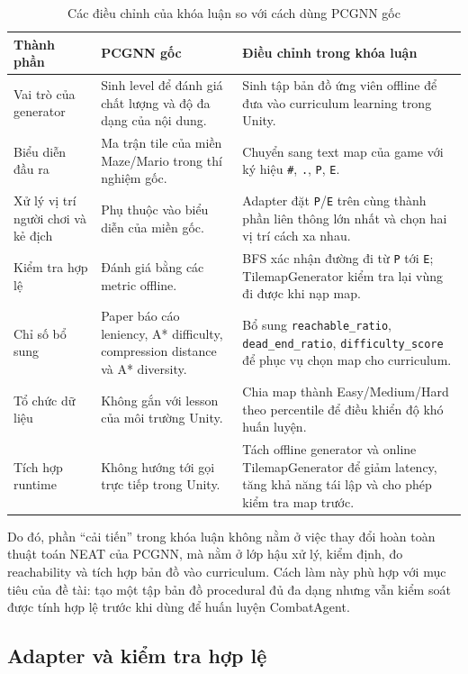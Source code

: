 \begin{table}[H]
    \centering
    \small
    \caption{Các điều chỉnh của khóa luận so với cách dùng PCGNN gốc}
    \label{tab:pcgnn_improvements}
    \begin{tabular}{p{4.0cm} p{5.0cm} p{5.0cm}}
        \toprule
        \textbf{Thành phần} & \textbf{PCGNN gốc} & \textbf{Điều chỉnh trong khóa luận} \\
        \midrule
        Vai trò của generator & Sinh level để đánh giá chất lượng và độ đa dạng của nội dung. & Sinh tập bản đồ ứng viên offline để đưa vào curriculum learning trong Unity. \\
        Biểu diễn đầu ra & Ma trận tile của miền Maze/Mario trong thí nghiệm gốc. & Chuyển sang text map của game với ký hiệu \texttt{\#}, \texttt{.}, \texttt{P}, \texttt{E}. \\
        Xử lý vị trí người chơi và kẻ địch & Phụ thuộc vào biểu diễn của miền gốc. & Adapter đặt \texttt{P}/\texttt{E} trên cùng thành phần liên thông lớn nhất và chọn hai vị trí cách xa nhau. \\
        Kiểm tra hợp lệ & Đánh giá bằng các metric offline. & BFS xác nhận đường đi từ \texttt{P} tới \texttt{E}; TilemapGenerator kiểm tra lại vùng đi được khi nạp map. \\
        Chỉ số bổ sung & Paper báo cáo leniency, A* difficulty, compression distance và A* diversity. & Bổ sung \texttt{reachable\_ratio}, \texttt{dead\_end\_ratio}, \texttt{difficulty\_score} để phục vụ chọn map cho curriculum. \\
        Tổ chức dữ liệu & Không gắn với lesson của môi trường Unity. & Chia map thành Easy/Medium/Hard theo percentile để điều khiển độ khó huấn luyện. \\
        Tích hợp runtime & Không hướng tới gọi trực tiếp trong Unity. & Tách offline generator và online TilemapGenerator để giảm latency, tăng khả năng tái lập và cho phép kiểm tra map trước. \\
        \bottomrule
    \end{tabular}
\end{table}

Do đó, phần ``cải tiến'' trong khóa luận không nằm ở việc thay đổi hoàn toàn thuật toán NEAT của PCGNN, mà nằm ở lớp hậu xử lý, kiểm định, đo reachability và tích hợp bản đồ vào curriculum. Cách làm này phù hợp với mục tiêu của đề tài: tạo một tập bản đồ procedural đủ đa dạng nhưng vẫn kiểm soát được tính hợp lệ trước khi dùng để huấn luyện CombatAgent.

\subsection{Adapter và kiểm tra hợp lệ}

